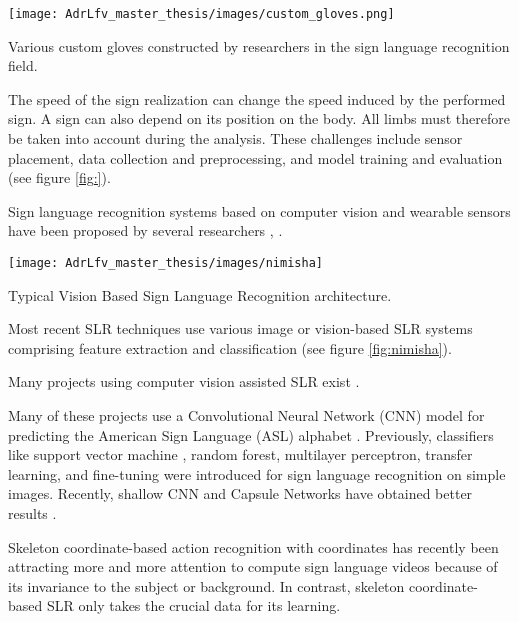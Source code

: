 \begin{marginfigure}
    \centering
    \texttt{[image: AdrLfv\_master\_thesis/images/custom\_gloves.png]}
    \caption{Various custom gloves constructed by researchers in the sign language recognition field.}
    \label{fig:custom_gloves}
\end{marginfigure}

The speed of the sign realization can change the speed induced by the performed sign. A sign can also depend on its position on the body. All limbs must therefore be taken into account during the analysis. These challenges include sensor placement, data collection and preprocessing, and model training and evaluation \cite{9178440} (see figure \ref{fig:}).

Sign language recognition systems based on computer vision and wearable sensors have been proposed by several researchers \cite{ionescu2005dynamic} \cite{yu2010vision} \cite{li2015feature} \cite{sonkusare2015review} \cite{bobic2016hand} \cite{islam2017real} \cite{islam2017real} \cite{saha2018machine}, \cite{rastgoo2021hand} \cite{xu2021application}. 

\begin{marginfigure}
    \centering
    \texttt{[image: AdrLfv\_master\_thesis/images/nimisha]}
    \caption{Typical Vision Based Sign Language Recognition architecture.}
    \label{fig:nimisha}
\end{marginfigure}

Most recent SLR techniques use various image or vision-based SLR systems comprising feature extraction and classification \cite{nimisha2020brief} (see figure \ref{fig:nimisha}). 

Many projects using computer vision assisted SLR exist \cite{admasu2010ethiopian} \cite{deriche2019intelligent} \cite{ahram2021advances} \cite{song2021intelligent} \cite{lee2021american} \cite{lee2021comparative} \cite{gao2021rnn}. 

Many of these projects use a Convolutional Neural Network (CNN) model for predicting the American Sign Language (ASL) alphabet \cite{bin2019study}. Previously, classifiers like support vector machine \cite{savur2015real}, random forest, multilayer perceptron, transfer learning, and fine-tuning \cite{saleh2020arabic} were introduced for sign language recognition on simple images. Recently, shallow CNN and Capsule Networks have obtained better results \cite{hasan2020classification}. 

Skeleton coordinate-based action recognition with coordinates has recently been attracting more and more attention to compute sign language videos because of its invariance to the subject or background. In contrast, skeleton coordinate-based SLR only takes the crucial data for its learning. 


